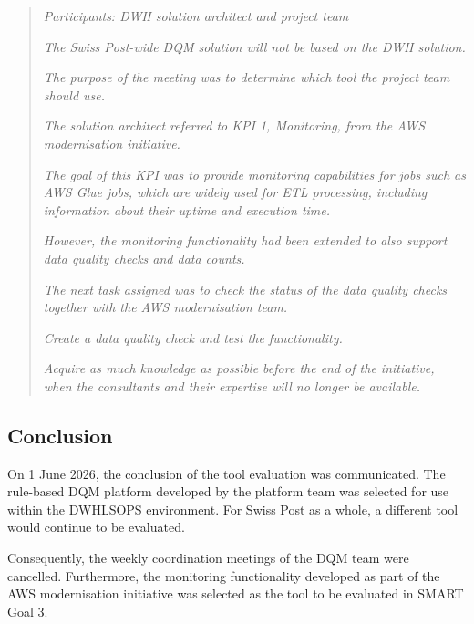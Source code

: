 \begin{quote}
\textit{Participants: DWH solution architect and project team}

\textit{The Swiss Post-wide DQM solution will not be based on the DWH solution.}

\textit{The purpose of the meeting was to determine which tool the project team should use.}

\textit{The solution architect referred to KPI 1, Monitoring, from the AWS modernisation initiative.}

\textit{The goal of this KPI was to provide monitoring capabilities for jobs such as AWS Glue jobs, which are widely used for ETL processing, including information about their uptime and execution time.}

\textit{However, the monitoring functionality had been extended to also support data quality checks and data counts.}

\textit{The next task assigned was to check the status of the data quality checks together with the AWS modernisation team.}

\textit{Create a data quality check and test the functionality.}

\textit{Acquire as much knowledge as possible before the end of the initiative, when the consultants and their expertise will no longer be available.}
\end{quote}




\subsection*{Conclusion}

On 1 June 2026, the conclusion of the tool evaluation was communicated. The rule-based \gls{DQM} platform developed by the platform team was selected for use within the \gls{DWHLSOPS} environment. For Swiss Post as a whole, a different tool would continue to be evaluated.

Consequently, the weekly coordination meetings of the \gls{DQM} team were cancelled. Furthermore, the monitoring functionality developed as part of the AWS modernisation initiative was selected as the tool to be evaluated in SMART Goal 3.